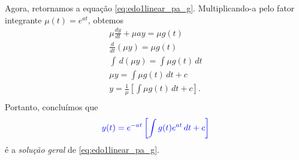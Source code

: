Agora, retornamos a equação \eqref{eq:edo1linear_pa_g}. Multiplicando-a pelo fator integrante $\mu(t) = e^{at}$, obtemos
\begin{gather}
  \mu\frac{dy}{dt} + \mu a y = \mu g(t) \\
  \frac{d}{dt}\left(\mu y\right) = \mu g(t) \\
  \int \,d(\mu y) = \int \mu g(t)\,dt \\
  \mu y = \int \mu g(t)\,dt + c \\
  y = \frac{1}{\mu}\left[\int \mu g(t)\,dt + c\right]. \\
\end{gather}
Portanto, concluímos que
\begin{equation}
  \color{blue}{y(t) = e^{-at}\left[\int g(t)e^{at}\,dt + c\right]}
\end{equation}
é a \emph{solução geral} de \eqref{eq:edo1linear_pa_g}.

